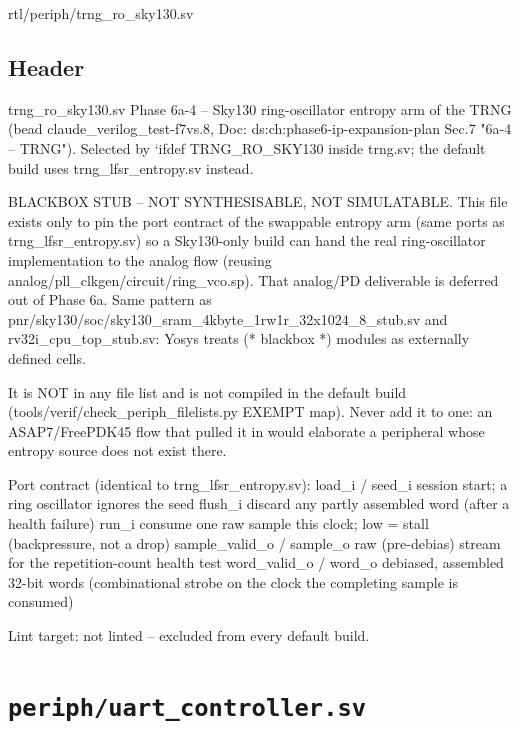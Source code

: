 \begin{relocated}{rtl/periph/trng_ro_sky130.sv}

\subsection*{Header}

\begin{textblock}
trng_ro_sky130.sv
Phase 6a-4 -- Sky130 ring-oscillator entropy arm of the TRNG (bead claude_verilog_test-f7vs.8,
Doc: ds:ch:phase6-ip-expansion-plan Sec.7 "6a-4 -- TRNG"). Selected by `ifdef TRNG_RO_SKY130 inside
trng.sv; the default build uses trng_lfsr_entropy.sv instead.

BLACKBOX STUB -- NOT SYNTHESISABLE, NOT SIMULATABLE. This file exists only to pin the port
contract of the swappable entropy arm (same ports as trng_lfsr_entropy.sv) so a Sky130-only
build can hand the real ring-oscillator implementation to the analog flow (reusing
analog/pll_clkgen/circuit/ring_vco.sp). That analog/PD deliverable is deferred out of Phase 6a.
Same pattern as pnr/sky130/soc/sky130_sram_4kbyte_1rw1r_32x1024_8_stub.sv and
rv32i_cpu_top_stub.sv: Yosys treats (* blackbox *) modules as externally defined cells.

It is NOT in any file list and is not compiled in the default build
(tools/verif/check_periph_filelists.py EXEMPT map). Never add it to one: an ASAP7/FreePDK45 flow
that pulled it in would elaborate a peripheral whose entropy source does not exist there.

Port contract (identical to trng_lfsr_entropy.sv):
  load_i / seed_i   session start; a ring oscillator ignores the seed
  flush_i           discard any partly assembled word (after a health failure)
  run_i             consume one raw sample this clock; low = stall (backpressure, not a drop)
  sample_valid_o / sample_o   raw (pre-debias) stream for the repetition-count health test
  word_valid_o / word_o       debiased, assembled 32-bit words (combinational strobe on the
                              clock the completing sample is consumed)

Lint target: not linted -- excluded from every default build.
\end{textblock}

\end{relocated}

\section{\texttt{periph/uart\_controller.sv}}\label{ds:mod:uart-controller}

